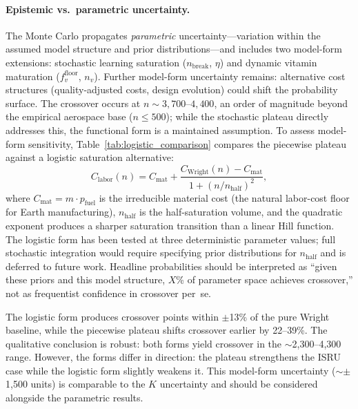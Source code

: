 \paragraph{Epistemic vs.\ parametric uncertainty.} The Monte Carlo propagates \emph{parametric} uncertainty---variation within the assumed model structure and prior distributions---and includes two model-form extensions: stochastic learning saturation ($n_{\mathrm{break}}$, $\eta$) and dynamic vitamin maturation ($f_v^{\mathrm{floor}}$, $n_v$). Further model-form uncertainty remains: alternative cost structures (quality-adjusted costs, design evolution) could shift the probability surface. The crossover occurs at $n \sim 3{,}700$--$4{,}400$, an order of magnitude beyond the empirical aerospace base ($n \leq 500$); while the stochastic plateau directly addresses this, the functional form is a maintained assumption. To assess model-form sensitivity, Table~\ref{tab:logistic_comparison} compares the piecewise plateau against a logistic saturation alternative:
\begin{equation}
  C_{\mathrm{labor}}(n) = C_{\mathrm{mat}} + \frac{C_{\mathrm{Wright}}(n) - C_{\mathrm{mat}}}{1 + (n/n_{\mathrm{half}})^2},
  \label{eq:logistic_saturation}
\end{equation}
where $C_{\mathrm{mat}} = m \cdot p_{\mathrm{fuel}}$ is the irreducible material cost (the natural labor-cost floor for Earth manufacturing), $n_{\mathrm{half}}$ is the half-saturation volume, and the quadratic exponent produces a sharper saturation transition than a linear Hill function. The logistic form has been tested at three deterministic parameter values; full stochastic integration would require specifying prior distributions for $n_{\mathrm{half}}$ and is deferred to future work. Headline probabilities should be interpreted as ``given these priors and this model structure, $X$\% of parameter space achieves crossover,'' not as frequentist confidence in crossover per~se.


The logistic form produces crossover points within $\pm$13\% of the pure Wright baseline, while the piecewise plateau shifts crossover earlier by 22--39\%. The qualitative conclusion is robust: both forms yield crossover in the $\sim$2{,}300--4{,}300 range. However, the forms differ in direction: the plateau strengthens the ISRU case while the logistic form slightly weakens it. This model-form uncertainty ($\sim$$\pm$1{,}500 units) is comparable to the $K$ uncertainty and should be considered alongside the parametric results.

